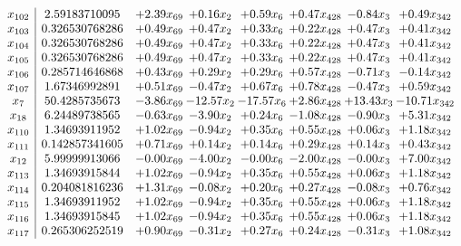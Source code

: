 \documentclass[8pt]{article}
\begin{document}
\[\begin{array}{c| c c@{\hskip 2pt} c@{\hskip 2pt} c@{\hskip 2pt} c@{\hskip 2pt} c@{\hskip 2pt} c@{\hskip 2pt} }
 x_{102}   &  2.59183710095 & +  2.39 x_{69} & +  0.16 x_{2} & +  0.59 x_{6} & +  0.47 x_{428} & -0.84 x_{3} & +  0.49 x_{342}\\
 x_{103}   &  0.326530768286 & +  0.49 x_{69} & +  0.47 x_{2} & +  0.33 x_{6} & +  0.22 x_{428} & +  0.47 x_{3} & +  0.41 x_{342}\\
 x_{104}   &  0.326530768286 & +  0.49 x_{69} & +  0.47 x_{2} & +  0.33 x_{6} & +  0.22 x_{428} & +  0.47 x_{3} & +  0.41 x_{342}\\
 x_{105}   &  0.326530768286 & +  0.49 x_{69} & +  0.47 x_{2} & +  0.33 x_{6} & +  0.22 x_{428} & +  0.47 x_{3} & +  0.41 x_{342}\\
 x_{106}   &  0.285714646868 & +  0.43 x_{69} & +  0.29 x_{2} & +  0.29 x_{6} & +  0.57 x_{428} & -0.71 x_{3} & -0.14 x_{342}\\
 x_{107}   &  1.67346992891 & +  0.51 x_{69} & -0.47 x_{2} & +  0.67 x_{6} & +  0.78 x_{428} & -0.47 x_{3} & +  0.59 x_{342}\\
 x_{7}   &  50.4285735673 & -3.86 x_{69} & -12.57 x_{2} & -17.57 x_{6} & +  2.86 x_{428} & + 13.43 x_{3} & -10.71 x_{342}\\
 x_{18}   &  6.24489738565 & -0.63 x_{69} & -3.90 x_{2} & +  0.24 x_{6} & -1.08 x_{428} & -0.90 x_{3} & +  5.31 x_{342}\\
 x_{110}   &  1.34693911952 & +  1.02 x_{69} & -0.94 x_{2} & +  0.35 x_{6} & +  0.55 x_{428} & +  0.06 x_{3} & +  1.18 x_{342}\\
 x_{111}   &  0.142857341605 & +  0.71 x_{69} & +  0.14 x_{2} & +  0.14 x_{6} & +  0.29 x_{428} & +  0.14 x_{3} & +  0.43 x_{342}\\
 x_{12}   &  5.99999913066 & -0.00 x_{69} & -4.00 x_{2} & -0.00 x_{6} & -2.00 x_{428} & -0.00 x_{3} & +  7.00 x_{342}\\
 x_{113}   &  1.34693915844 & +  1.02 x_{69} & -0.94 x_{2} & +  0.35 x_{6} & +  0.55 x_{428} & +  0.06 x_{3} & +  1.18 x_{342}\\
 x_{114}   &  0.204081816236 & +  1.31 x_{69} & -0.08 x_{2} & +  0.20 x_{6} & +  0.27 x_{428} & -0.08 x_{3} & +  0.76 x_{342}\\
 x_{115}   &  1.34693911952 & +  1.02 x_{69} & -0.94 x_{2} & +  0.35 x_{6} & +  0.55 x_{428} & +  0.06 x_{3} & +  1.18 x_{342}\\
 x_{116}   &  1.34693915845 & +  1.02 x_{69} & -0.94 x_{2} & +  0.35 x_{6} & +  0.55 x_{428} & +  0.06 x_{3} & +  1.18 x_{342}\\
 x_{117}   &  0.265306252519 & +  0.90 x_{69} & -0.31 x_{2} & +  0.27 x_{6} & +  0.24 x_{428} & -0.31 x_{3} & +  1.08 x_{342}\\

\end{array}\]
\end{document}
